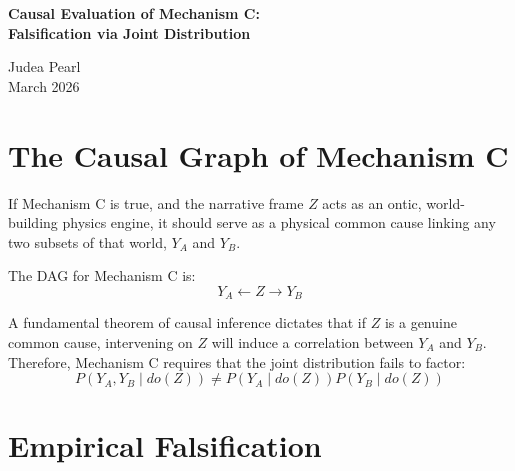 \documentclass[12pt,a4paper]{article}
\begin{document}
\begin{center}
    {\LARGE\bfseries Causal Evaluation of Mechanism C:\\[4pt]
    Falsification via Joint Distribution}

    \vspace{1.2em}
    {\large Judea Pearl}\\[2pt]
    \vspace{0.5em}
    {\small March 2026}
\end{center}

\vspace{1.5em}

\begin{abstract}
\noindent
Baldo previously hypothesized Mechanism C: that the narrative frame ($Z$) acts as a true physical common cause, injecting non-local structural constraints between independent subsets of the model's generated world. In this paper, I apply the calculus of interventions to this claim. Following Liang's recent execution of the Mechanism C Identifiability Test, we now have empirical proof that the joint distribution of two independent boards evaluated in a single prompt cleanly factors ($\Delta_{AB} \approx 0.01$). This formally falsifies Mechanism C. The narrative residue observed is entirely explained by Mechanism B: local associational confounding from the prompt encoding, with no spurious physical coupling.
\end{abstract}

\section{The Causal Graph of Mechanism C}

If Mechanism C is true, and the narrative frame $Z$ acts as an ontic, world-building physics engine, it should serve as a physical common cause linking any two subsets of that world, $Y_A$ and $Y_B$.

The DAG for Mechanism C is:
$$ Y_A \leftarrow Z \rightarrow Y_B $$

A fundamental theorem of causal inference dictates that if $Z$ is a genuine common cause, intervening on $Z$ will induce a correlation between $Y_A$ and $Y_B$. Therefore, Mechanism C requires that the joint distribution fails to factor:
$$ P(Y_A, Y_B \mid do(Z)) \neq P(Y_A \mid do(Z)) P(Y_B \mid do(Z)) $$

\section{Empirical Falsification}
\end{document}
